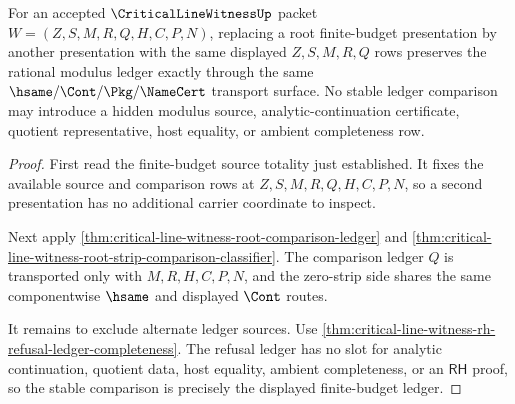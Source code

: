 \begin{theorem}
\label{thm:critical-line-witness-root-finite-budget-ledger-stability}
For an accepted $\CriticalLineWitnessUp$ packet
$W=(Z,S,M,R,Q,H,C,P,N)$, replacing a root finite-budget presentation by another
presentation with the same displayed $Z,S,M,R,Q$ rows preserves the rational
modulus ledger exactly through the same $\hsame/\Cont/\Pkg/\NameCert$ transport
surface. No stable ledger comparison may introduce a hidden modulus source,
analytic-continuation certificate, quotient representative, host equality, or
ambient completeness row.
\end{theorem}
\begin{proof}
First read the finite-budget source totality just established. It fixes the
available source and comparison rows at $Z,S,M,R,Q,H,C,P,N$, so a second
presentation has no additional carrier coordinate to inspect.

Next apply
\autoref{thm:critical-line-witness-root-comparison-ledger} and
\autoref{thm:critical-line-witness-root-strip-comparison-classifier}. The
comparison ledger $Q$ is transported only with $M,R,H,C,P,N$, and the
zero-strip side shares the same componentwise $\hsame$ and displayed $\Cont$
routes.

It remains to exclude alternate ledger sources. Use
\autoref{thm:critical-line-witness-rh-refusal-ledger-completeness}. The
refusal ledger has no slot for analytic continuation, quotient data, host
equality, ambient completeness, or an $\mathsf{RH}$ proof, so the stable
comparison is precisely the displayed finite-budget ledger.
\end{proof}

